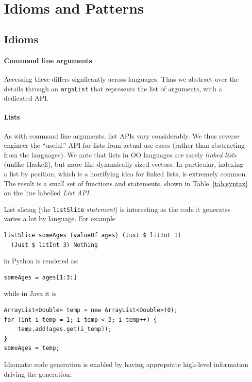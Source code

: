 \documentclass[sigplan,screen,10pt]{acmart}
\begin{document}
\section{Idioms and Patterns} \label{sec:patterns}

\subsection{Idioms}

\paragraph{Command line arguments} Accessing these differs
signficantly across languages.  Thus we abstract over the details through an
\verb|argsList| that represents the list of arguments, with a dedicated API.

\paragraph{Lists}
As with command line arguments, list APIs vary considerably.
We thus reverse engineer the ``useful'' API for lists from actual
use cases (rather than abstracting from the languages). We note that
lists in OO languages are rarely \emph{linked lists} (unlike Haskell), but
more like dynamically sized vectors. In particular, indexing a list by
position, which is a horrifying idea for linked lists, is extremely common.
The result is a small set of functions and statements, shown in
Table~\ref{tab:syntax} on the line labelled \emph{List API}.

List slicing (the \verb|listSlice|
\emph{statement}) is interesting as the code it generates varies
a lot by language.  For example
\begin{lstlisting}
listSlice someAges (valueOf ages) (Just $ litInt 1) 
  (Just $ litInt 3) Nothing
\end{lstlisting}
in Python is rendered as:
\begin{lstlisting}
someAges = ages[1:3:]
\end{lstlisting}
while in Java it is
\begin{lstlisting}
ArrayList<Double> temp = new ArrayList<Double>(0);
for (int i_temp = 1; i_temp < 3; i_temp++) {
    temp.add(ages.get(i_temp));
}
someAges = temp;
\end{lstlisting}
Idiomatic code generation is enabled by having
appropriate high-level information driving the generation.
\end{document}
